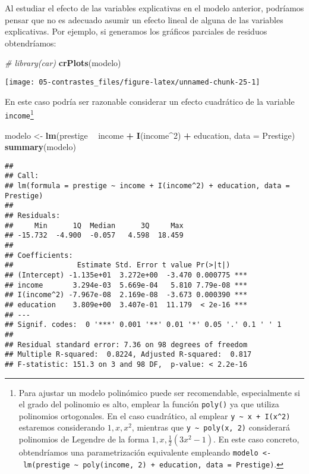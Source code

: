 \documentclass[
]{book}
\newenvironment{Shaded}{\begin{snugshade}}{\end{snugshade}}
\newcommand{\CommentTok}[1]{\textcolor[rgb]{0.56,0.35,0.01}{\textit{#1}}}
\newcommand{\DataTypeTok}[1]{\textcolor[rgb]{0.13,0.29,0.53}{#1}}
\newcommand{\DecValTok}[1]{\textcolor[rgb]{0.00,0.00,0.81}{#1}}
\newcommand{\KeywordTok}[1]{\textcolor[rgb]{0.13,0.29,0.53}{\textbf{#1}}}
\newcommand{\NormalTok}[1]{#1}
\newcommand{\OperatorTok}[1]{\textcolor[rgb]{0.81,0.36,0.00}{\textbf{#1}}}
\newcommand{\StringTok}[1]{\textcolor[rgb]{0.31,0.60,0.02}{#1}}
\theoremstyle{break}
\theoremstyle{definition}
\theoremstyle{definition}
\theoremstyle{definition}
\theoremstyle{remark}
\begin{document}
Al estudiar el efecto de las variables explicativas en el modelo
anterior, podríamos pensar que no es adecuado asumir un efecto lineal
de alguna de las variables explicativas. Por ejemplo, si generamos los gráficos
parciales de residuos obtendríamos:

\begin{Shaded}
\begin{Highlighting}[]
\CommentTok{# library(car)}
\KeywordTok{crPlots}\NormalTok{(modelo)}
\end{Highlighting}
\end{Shaded}

\begin{center}\texttt{[image: 05-contrastes\_files/figure-latex/unnamed-chunk-25-1]} \end{center}

En este caso podría ser razonable considerar un efecto cuadrático
de la variable \texttt{income}\footnote{Para ajustar un modelo polinómico
  puede ser recomendable, especialmente si el grado del polinomio es alto,
  emplear la función \texttt{poly()} ya que utiliza polinomios ortogonales.
  En el caso cuadrático, al emplear \texttt{y\ \textasciitilde{}\ x\ +\ I(x\^{}2)}
  estaremos considerando \(1, x, x^2\), mientras que \texttt{y\ \textasciitilde{}\ poly(x,\ 2)} considerará
  polinomios de Legendre de la forma \(1, x, \frac{1}{2}(3x^2-1)\).
  En este caso concreto, obtendríamos una parametrización equivalente
  empleando \texttt{modelo\ \textless{}-\ lm(prestige\ \textasciitilde{}\ poly(income,\ 2)\ +\ education,\ data\ =\ Prestige)}.}

\begin{Shaded}
\begin{Highlighting}[]
\NormalTok{modelo <-}\StringTok{ }\KeywordTok{lm}\NormalTok{(prestige }\OperatorTok{~}\StringTok{ }\NormalTok{income }\OperatorTok{+}\StringTok{ }\KeywordTok{I}\NormalTok{(income}\OperatorTok{^}\DecValTok{2}\NormalTok{) }\OperatorTok{+}\StringTok{ }\NormalTok{education, }\DataTypeTok{data =}\NormalTok{ Prestige)}
\KeywordTok{summary}\NormalTok{(modelo)}
\end{Highlighting}
\end{Shaded}

\begin{verbatim}
## 
## Call:
## lm(formula = prestige ~ income + I(income^2) + education, data = Prestige)
## 
## Residuals:
##     Min      1Q  Median      3Q     Max 
## -15.732  -4.900  -0.057   4.598  18.459 
## 
## Coefficients:
##               Estimate Std. Error t value Pr(>|t|)    
## (Intercept) -1.135e+01  3.272e+00  -3.470 0.000775 ***
## income       3.294e-03  5.669e-04   5.810 7.79e-08 ***
## I(income^2) -7.967e-08  2.169e-08  -3.673 0.000390 ***
## education    3.809e+00  3.407e-01  11.179  < 2e-16 ***
## ---
## Signif. codes:  0 '***' 0.001 '**' 0.01 '*' 0.05 '.' 0.1 ' ' 1
## 
## Residual standard error: 7.36 on 98 degrees of freedom
## Multiple R-squared:  0.8224, Adjusted R-squared:  0.817 
## F-statistic: 151.3 on 3 and 98 DF,  p-value: < 2.2e-16
\end{verbatim}
\end{document}
